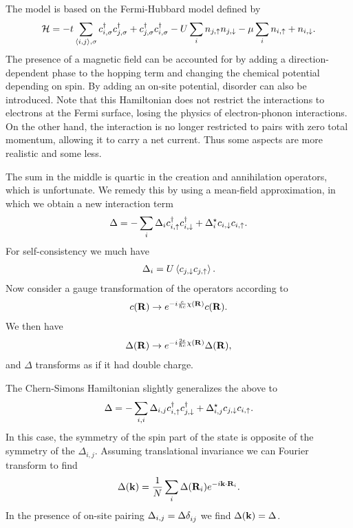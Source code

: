 The model is based on the Fermi-Hubbard model defined by
\begin{align*}
	\mathcal{H} = -t\sum\limits_{\expval{i, j}, \sigma}c_{i, \sigma}^{\dagger} c_{j, \sigma}^{\dagger} + c_{j, \sigma}^{\dagger} c_{i, \sigma}^{\dagger} - U\sum\limits_{i}n_{j, \uparrow}n_{j, \downarrow} - \mu\sum\limits_{i}n_{i, \uparrow} + n_{i, \downarrow}.
\end{align*}
The presence of a magnetic field can be accounted for by adding a direction-dependent phase to the hopping term and changing the chemical potential depending on spin. By adding an on-site potential, disorder can also be introduced. Note that this Hamiltonian does not restrict the interactions to electrons at the Fermi surface, losing the physics of electron-phonon interactions. On the other hand, the interaction is no longer restricted to pairs with zero total momentum, allowing it to carry a net current. Thus some aspects are more realistic and some less.

The sum in the middle is quartic in the creation and annihilation operators, which is unfortunate. We remedy this by using a mean-field approximation, in which we obtain a new interaction term
\begin{align*}
	\Delta = -\sum\limits_{i}\Delta_{i}c_{i, \uparrow}^{\dagger} c_{i, \downarrow}^{\dagger} + \Delta_{i}^{\star} c_{i, \downarrow}c_{i, \uparrow}.
\end{align*}
For self-consistency we much have
\begin{align*}
	\Delta_{i} = U\expval{c_{j, \downarrow}c_{j, \uparrow}}.
\end{align*}
Now consider a gauge transformation of the operators according to
\begin{align*}
	c(\vb{R})\to e^{-i\frac{e}{\hbar c}\chi(\vb{R})}c(\vb{R}).
\end{align*}
We then have
\begin{align*}
	\Delta(\vb{R})\to e^{-i\frac{2e}{\hbar c}\chi(\vb{R})}\Delta(\vb{R}),
\end{align*}
and $\Delta$ transforms as if it had double charge.

The Chern-Simons Hamiltonian slightly generalizes the above to
\begin{align*}
	\Delta = -\sum\limits_{i, i}\Delta_{i, j}c_{i, \uparrow}^{\dagger} c_{j, \downarrow}^{\dagger} + \Delta_{i, j}^{\star} c_{j, \downarrow}c_{i, \uparrow}.
\end{align*}
In this case, the symmetry of the spin part of the state is opposite of the symmetry of the $\Delta_{i, j}$. Assuming translational invariance we can Fourier transform to find
\begin{align*}
	\Delta(\vb{k}) = \frac{1}{N}\sum\limits_{i}\Delta(\vb{R}_{i})e^{-i\vb{k}\cdot\vb{R}_{i}}.
\end{align*}
In the presence of on-site pairing $\Delta_{i, j} = \Delta\kdelta{}{ij}$ we find $\Delta(\vb{k}) = \Delta$.

